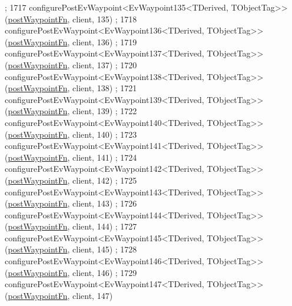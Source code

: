 \begin{DoxyCode}
      ;
1717     configurePostEvWaypoint<EvWaypoint135<TDerived, TObjectTag>>(\hyperlink{classmove__base__z__client_1_1WaypointEventDispatcher_acc538eb7506c13f7cca2268a1742dadd}{postWaypointFn}, client, 135)
      ;
1718     configurePostEvWaypoint<EvWaypoint136<TDerived, TObjectTag>>(\hyperlink{classmove__base__z__client_1_1WaypointEventDispatcher_acc538eb7506c13f7cca2268a1742dadd}{postWaypointFn}, client, 136)
      ;
1719     configurePostEvWaypoint<EvWaypoint137<TDerived, TObjectTag>>(\hyperlink{classmove__base__z__client_1_1WaypointEventDispatcher_acc538eb7506c13f7cca2268a1742dadd}{postWaypointFn}, client, 137)
      ;
1720     configurePostEvWaypoint<EvWaypoint138<TDerived, TObjectTag>>(\hyperlink{classmove__base__z__client_1_1WaypointEventDispatcher_acc538eb7506c13f7cca2268a1742dadd}{postWaypointFn}, client, 138)
      ;
1721     configurePostEvWaypoint<EvWaypoint139<TDerived, TObjectTag>>(\hyperlink{classmove__base__z__client_1_1WaypointEventDispatcher_acc538eb7506c13f7cca2268a1742dadd}{postWaypointFn}, client, 139)
      ;
1722     configurePostEvWaypoint<EvWaypoint140<TDerived, TObjectTag>>(\hyperlink{classmove__base__z__client_1_1WaypointEventDispatcher_acc538eb7506c13f7cca2268a1742dadd}{postWaypointFn}, client, 140)
      ;
1723     configurePostEvWaypoint<EvWaypoint141<TDerived, TObjectTag>>(\hyperlink{classmove__base__z__client_1_1WaypointEventDispatcher_acc538eb7506c13f7cca2268a1742dadd}{postWaypointFn}, client, 141)
      ;
1724     configurePostEvWaypoint<EvWaypoint142<TDerived, TObjectTag>>(\hyperlink{classmove__base__z__client_1_1WaypointEventDispatcher_acc538eb7506c13f7cca2268a1742dadd}{postWaypointFn}, client, 142)
      ;
1725     configurePostEvWaypoint<EvWaypoint143<TDerived, TObjectTag>>(\hyperlink{classmove__base__z__client_1_1WaypointEventDispatcher_acc538eb7506c13f7cca2268a1742dadd}{postWaypointFn}, client, 143)
      ;
1726     configurePostEvWaypoint<EvWaypoint144<TDerived, TObjectTag>>(\hyperlink{classmove__base__z__client_1_1WaypointEventDispatcher_acc538eb7506c13f7cca2268a1742dadd}{postWaypointFn}, client, 144)
      ;
1727     configurePostEvWaypoint<EvWaypoint145<TDerived, TObjectTag>>(\hyperlink{classmove__base__z__client_1_1WaypointEventDispatcher_acc538eb7506c13f7cca2268a1742dadd}{postWaypointFn}, client, 145)
      ;
1728     configurePostEvWaypoint<EvWaypoint146<TDerived, TObjectTag>>(\hyperlink{classmove__base__z__client_1_1WaypointEventDispatcher_acc538eb7506c13f7cca2268a1742dadd}{postWaypointFn}, client, 146)
      ;
1729     configurePostEvWaypoint<EvWaypoint147<TDerived, TObjectTag>>(\hyperlink{classmove__base__z__client_1_1WaypointEventDispatcher_acc538eb7506c13f7cca2268a1742dadd}{postWaypointFn}, client, 147)

\end{DoxyCode}
